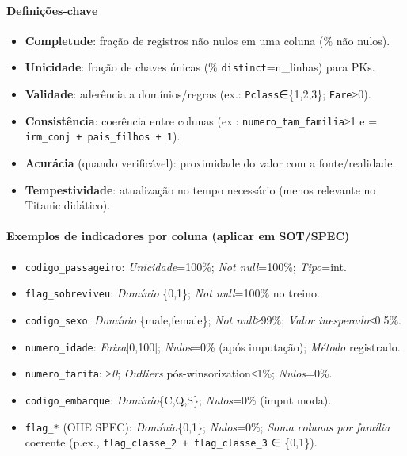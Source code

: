 \documentclass[12pt,a4paper]{article}
\begin{document}
\paragraph{Definições-chave}
\begin{itemize}[leftmargin=1.25em]
  \item \textbf{Completude}: fração de registros não nulos em uma coluna (\% não nulos).
  \item \textbf{Unicidade}: fração de chaves únicas (\% \texttt{distinct}=n\_linhas) para PKs.
  \item \textbf{Validade}: aderência a domínios/regras (ex.: \texttt{Pclass}∈\{1,2,3\}; \texttt{Fare}≥0).
  \item \textbf{Consistência}: coerência entre colunas (ex.: \texttt{numero\_tam\_familia}≥1 e = \texttt{irm\_conj + pais\_filhos + 1}).
  \item \textbf{Acurácia} (quando verificável): proximidade do valor com a fonte/realidade.
  \item \textbf{Tempestividade}: atualização no tempo necessário (menos relevante no Titanic didático).
\end{itemize}

\paragraph{Exemplos de indicadores por coluna (aplicar em SOT/SPEC)}
\begin{itemize}[leftmargin=1.25em]
  \item \texttt{codigo\_passageiro}: \textit{Unicidade}=100\%; \textit{Not null}=100\%; \textit{Tipo}=int.
  \item \texttt{flag\_sobreviveu}: \textit{Domínio} \{0,1\}; \textit{Not null}=100\% no treino.
  \item \texttt{codigo\_sexo}: \textit{Domínio} \{male,female\}; \textit{Not null}≥99\%; \textit{Valor inesperado}≤0.5\%.
  \item \texttt{numero\_idade}: \textit{Faixa}[0,100]; \textit{Nulos}=0\% (após imputação); \textit{Método} registrado.
  \item \texttt{numero\_tarifa}: \textit{≥0}; \textit{Outliers} pós-winsorization≤1\%; \textit{Nulos}=0\%.
  \item \texttt{codigo\_embarque}: \textit{Domínio}\{C,Q,S\}; \textit{Nulos}=0\% (imput moda).
  \item \texttt{flag\_*} (OHE SPEC): \textit{Domínio}\{0,1\}; \textit{Nulos}=0\%; \textit{Soma colunas por família} coerente (p.ex., \texttt{flag\_classe\_2 + flag\_classe\_3} ∈ \{0,1\}).
\end{itemize}
\end{document}
